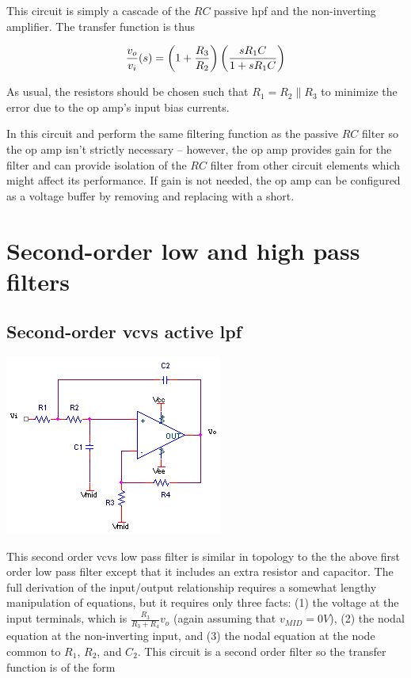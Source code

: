This circuit is simply a cascade of the \(RC\) passive \ac{hpf} and the non-inverting amplifier.
The transfer function is thus

\textcolor{red}{
	\begin{equation}\frac{\vout}{\vin}(s) = \left(1 + \frac{R_3}{R_2}\right)\left(\frac{sR_1 C}{1 + sR_1 C}\right)
	\label{eq:active1storderHPF}
\end{equation}
}

As usual, the resistors should be chosen such that \(R_1 = R_2 \parallel R_3\) to minimize the error due to the op amp's input bias currents.

In this circuit \R[1] and \C perform the same filtering function as the passive \(RC\) filter so the op amp isn't strictly necessary -- however, the op amp provides gain for the filter and can provide isolation of the \(RC\) filter from other circuit elements which might affect its performance.
If gain is not needed, the op amp can be configured as a voltage buffer by removing \R[2] and replacing \R[3] with a short.

\section{Second-order low and high pass filters}
\subsection{Second-order \acs{vcvs} active \acl{lpf}}
\begin{center}
	\includegraphics{schematics/2ndorder_vcvs_LPfilter.PNG}
\end{center}
This second order \ac{vcvs} low pass filter is similar in topology to the the above first order low pass filter except that it includes an extra resistor and capacitor. The full derivation of the input/output relationship requires a somewhat lengthy manipulation of equations, but it requires only three facts: (1) the voltage at the input terminals, which is $\frac{R_{3}}{R_{3}+R_{4}}v_{o}$ (again assuming that $v_{MID} = 0V$), (2) the nodal equation at the non-inverting input, and (3) the nodal equation at the node common to $R_{1}$, $R_{2}$, and $C_{2}$. This circuit is a second order filter so the transfer function is of the form

